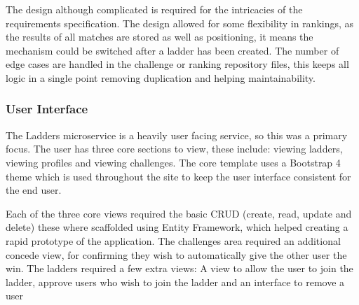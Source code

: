 \par
The design although complicated is required for the intricacies of the requirements specification. The design allowed for some flexibility in rankings, as the results of all matches are stored as well as positioning, it means the mechanism could be switched after a ladder has been created. The number of edge cases are handled in the challenge or ranking repository files, this keeps all logic in a single point removing duplication and helping maintainability.

\subsubsection{User Interface}
\par
The Ladders microservice is a heavily user facing service, so this was a primary focus. The user has three core sections to view, these include: viewing ladders, viewing profiles and viewing challenges. The core template uses a Bootstrap 4 theme which is used throughout the site to keep the user interface consistent for the end user.

\par
Each of the three core views required the basic CRUD (create, read, update and delete) these where scaffolded using Entity Framework, which helped creating a rapid prototype of the application. The challenges area required an additional concede view, for confirming they wish to automatically give the other user the win. The ladders required a few extra views: A view to allow the user to join the ladder, approve users who wish to join the ladder and an interface to remove a user
